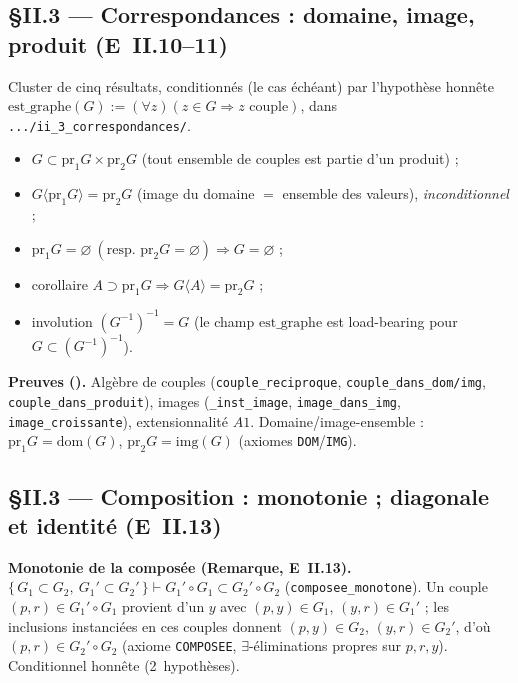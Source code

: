 
\subsection{§II.3 --- Correspondances : domaine, image, produit (E~II.10--11)}
Cluster de cinq résultats, conditionnés (le cas échéant) par l'hypothèse honnête
$\mathrm{est\_graphe}(G):=(\forall z)(z\in G\Rightarrow z\text{ couple})$, dans
\texttt{.../ii\_3\_correspondances/}.
\begin{itemize}
  \item $G\subset \mathrm{pr}_1G\times\mathrm{pr}_2G$ (tout ensemble de couples est partie d'un produit) ;
  \item $G\langle\mathrm{pr}_1G\rangle=\mathrm{pr}_2G$ (image du domaine $=$ ensemble des valeurs), \emph{inconditionnel} ;
  \item $\mathrm{pr}_1G=\varnothing\ (\text{resp. }\mathrm{pr}_2G=\varnothing)\Rightarrow G=\varnothing$ ;
  \item corollaire $A\supset\mathrm{pr}_1G\Rightarrow G\langle A\rangle=\mathrm{pr}_2G$ ;
  \item involution $(G^{-1})^{-1}=G$ (le champ $\mathrm{est\_graphe}$ est load-bearing
        pour $G\subset(G^{-1})^{-1}$).
\end{itemize}
\textbf{Preuves (\Nstar).} Algèbre de couples (\texttt{couple\_reciproque},
\texttt{couple\_dans\_dom/img}, \texttt{couple\_dans\_produit}), images
(\texttt{\_inst\_image}, \texttt{image\_dans\_img}, \texttt{image\_croissante}),
extensionnalité $A1$. Domaine/image-ensemble : $\mathrm{pr}_1G=\mathrm{dom}(G)$,
$\mathrm{pr}_2G=\mathrm{img}(G)$ (axiomes \texttt{DOM}/\texttt{IMG}).

\subsection{§II.3 --- Composition : monotonie ; diagonale et identité (E~II.13)}
\textbf{Monotonie de la composée (Remarque, E~II.13).}
$\{\,G_1\subset G_2,\ G_1'\subset G_2'\,\}\vdash G_1'\circ G_1\subset G_2'\circ G_2$
(\texttt{composee\_monotone}). Un couple $(p,r)\in G_1'\circ G_1$ provient d'un
$y$ avec $(p,y)\in G_1$, $(y,r)\in G_1'$ ; les inclusions instanciées en ces couples
donnent $(p,y)\in G_2$, $(y,r)\in G_2'$, d'où $(p,r)\in G_2'\circ G_2$
(axiome \texttt{COMPOSEE}, $\exists$-éliminations propres sur $p,r,y$).
Conditionnel honnête (2~hypothèses).

